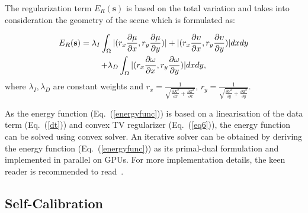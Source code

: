 \documentclass[10pt,twocolumn,letterpaper]{article}
\begin{document}
The regularization term $E_{R}(\textbf{s})$ is based on the total 
variation and takes into consideration the geometry of the scene which is 
formulated as:

\begin{gather}
E_{R}(\textbf{s}) = \lambda_{I}\int_{\Omega}|(r_{x}\frac{\partial \mu}{\partial x},r_{y}\frac{\partial \mu}{\partial y})|+|(r_{x}\frac{\partial \upsilon}{\partial x},r_{y}\frac{\partial \upsilon}{\partial y})|dxdy \notag \\
+ \lambda_{D}\int_{\Omega}|(r_{x}\frac{\partial \omega}{\partial x},r_{y}\frac{\partial \omega}{\partial y})|dxdy,\label{eq6}
\end{gather}
where $\lambda_{I},\lambda_{D}$ are constant weights and $r_{x} = \frac{1}{\sqrt{\frac{\partial X^{2}}{\partial x} + \frac{\partial Z^{2}}{\partial x} }}$, $r_{y} = \frac{1}{\sqrt{\frac{\partial Y^{2}}{\partial y} + \frac{\partial Z^{2}}{\partial y} }}$. 

As the energy function (Eq.~(\ref{energyfunc})) is based on a linearisation of the 
data term (Eq.~(\ref{dt})) and convex TV regularizer (Eq.~(\ref{eq6})), the energy function 
can be solved using convex solver. An iterative solver can be obtained by 
deriving the energy function (Eq.~(\ref{energyfunc})) as its primal-dual formulation 
and implemented in parallel on GPUs. For more implementation details, the keen 
reader is recommended to read~\cite{jaimezprimal}.



\subsection{Self-Calibration}\label{selfcalibration}
\end{document}
